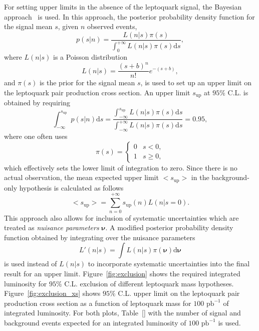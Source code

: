 For setting upper limits in the absence of the leptoquark signal, the Bayesian approach~\cite{ref:bayes} is used. In this approach, the
posterior probability density function for the signal mean $s$, given $n$ observed events,
\begin{equation}
p(s|n)=\frac{L(n|s)\pi(s)}{\int_0^{+\infty}L(n|s)\pi(s)\mathrm{d}s},
\end{equation}
where $L(n|s)$ is a Poisson distribution
\begin{equation}
L(n|s)=\frac{(s+b)^n}{n!}e^{-(s+b)},
\end{equation}
and $\pi(s)$ is the prior for the signal mean $s$, is used to set up an upper limit on the leptoquark pair production cross section.
An upper limit $s_\text{up}$ at $95\%$ C.L. is obtained by requiring
\begin{equation}
\int_{-\infty}^{s_\text{up}}p(s|n)\mathrm{d}s=\frac{\int_{-\infty}^{s_\text{up}}L(n|s)\pi(s)\mathrm{d}s}{\int_{-\infty}^{+\infty}L(n|s)\pi(s)\mathrm{d}s}=0.95, 
\end{equation}
where one often uses
\begin{equation}
\pi(s)=\begin{cases}
          0&  s<0,\\
          1&  s\geq 0,
\end{cases}
\end{equation}
which effectively sets the lower limit of integration to zero. Since there is no actual observation, the mean expected 
upper limit $\mathrm{<}s_\text{up}\mathrm{>}$ in the background-only hypothesis is calculated as follows
\begin{equation}
\mathrm{<}s_\text{up}\mathrm{>}=\sum_{n=0}^{+\infty} s_\text{up}(n)L(n|s=0).
\end{equation}
This approach also allows for inclusion of systematic uncertainties which are treated as \emph{nuisance parameters} $\bm{\nu}$.
A modified posterior probability density function obtained by integrating over the nuisance parameters
\begin{equation}
L'(n|s)=\int L(n|s)\pi(\bm{\nu})\mathrm{d}\bm{\nu}
\end{equation}
is used instead of $L(n|s)$ to incorporate systematic uncertainties into the final result for an upper limit. Figure~\ref{fig:exclusion}
shows the required integrated luminosity for $95\%$ C.L. exclusion of different leptoquark mass hypotheses. Figure~\ref{fig:exclusion_xs}
shows $95\%$ C.L. upper limit on the leptoquark pair production cross section as a function of leptoquark mass for $100\text{ pb}^{-1}$
of integrated luminosity. For both plots, Table~\ref{} with the number of signal and background events expected for an integrated luminosity
of $100\text{ pb}^{-1}$ is used.

